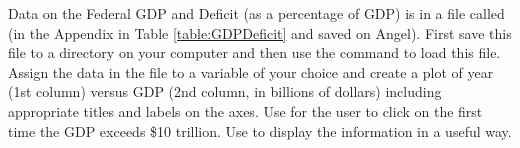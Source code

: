 {Data on the Federal GDP and Deficit (as a percentage of GDP) is in a file called  (in the Appendix in Table \ref{table:GDPDeficit} and saved on Angel).  First save this file to a directory on your computer and then use the command  to load this file.  Assign the data in the file to a variable of your choice and create a plot of year (1st column) versus GDP (2nd column, in billions of dollars) including appropriate titles and labels on the axes.  Use  for the user to click on the first time the GDP exceeds \$10 trillion.  Use  to display the information in a useful way.}
{}